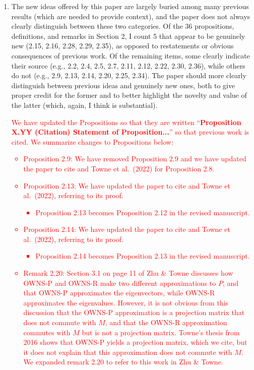 \documentclass{article}
\newcommand{\response}[1]{\textcolor{red}{#1}}
\begin{document}
\begin{enumerate}
    \item The new ideas offered by this paper are largely buried among many previous results (which are needed to provide context), and the paper does not always clearly distinguish between these two categories. Of the 36 propositions, definitions, and remarks in Section 2, I count 5 that appear to be genuinely new (2.15, 2.16, 2.28, 2.29, 2.35), as opposed to restatements or obvious consequences of previous work. Of the remaining items, some clearly indicate their source (e.g., 2.2, 2.4, 2.5, 2.7, 2.11, 2.12, 2.22, 2.30, 2.36), while others do not (e.g., 2.9, 2.13, 2.14, 2.20, 2.25, 2.34). The paper should more clearly distinguish between previous ideas and genuinely new ones, both to give proper credit for the former and to better highlight the novelty and value of the latter (which, again, I think is substantial).
    \response{
    We have updated the Propositions so that they are written ``\textbf{Proposition X.YY (Citation) Statement of Proposition...}'' so that previous work is cited. We summarize changes to Propositions below:
    \begin{itemize}
        \item Proposition 2.9: We have removed Proposition 2.9 and we have updated the paper to cite and Towne et al.\ (2022) for Proposition 2.8.
        \item Proposition 2.13: We have updated the paper to cite and Towne et al.\ (2022), referring to its proof.
        \begin{itemize}
            \item Proposition 2.13 becomes Proposition 2.12 in the revised manuscript.
        \end{itemize}
        \item Proposition 2.14: We have updated the paper to cite and Towne et al.\ (2022), referring to its proof.
        \begin{itemize}
            \item Proposition 2.14 becomes Proposition 2.13 in the revised manuscript.
        \end{itemize}
        \item Remark 2.20: Section 3.1 on page 11 of Zhu \& Towne discusses how OWNS-P and OWNS-R make two different approximations to $P$, and that OWNS-P approximates the eigenvectors, while OWNS-R approximates the eigenvalues. However, it is not obvious from this discussion that the OWNS-P approximation is a projection matrix that does not commute with $M$, and that the OWNS-R approximation commutes with $M$ but is not a projection matrix. Towne's thesis from 2016 shows that OWNS-P yields a projection matrix, which we cite, but it does not explain that this approximation does not commute with $M$. We expanded remark 2.20 to refer to this work in Zhu \& Towne.

\end{itemize}}
\end{enumerate}
\end{document}
